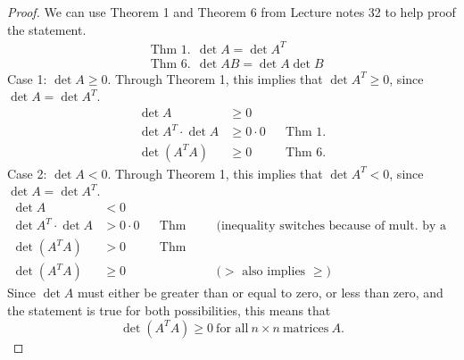\documentclass{article}
\begin{document}
\begin{proof}
  We can use Theorem 1 and Theorem 6 from Lecture notes 32 to help proof the statement.
  \begin{align*}
     & \text{Thm 1.}~~ \det A = \det A^T       \\
     & \text{Thm 6.}~~ \det AB = \det A \det B
  \end{align*}
  Case 1: $\det A \geq 0$. Through Theorem 1, this implies that $\det A^T \geq 0$, since $\det A = \det A^T$.
  \begin{align*}
    \det A                & \geq 0                            \\
    \det A^T \cdot \det A & \geq 0 \cdot 0 &  & \text{Thm 1.} \\
    \det (A^TA)           & \geq 0         &  & \text{Thm 6.}
  \end{align*}
  Case 2: $\det A < 0$. Through Theorem 1, this implies that $\det A^T < 0$, since $\det A = \det A^T$.
  \begin{align*}
    \det A                & < 0                                                                                             \\
    \det A^T \cdot \det A & > 0 \cdot 0 &  & \text{Thm 1.} &  & \text{(inequality switches because of mult. by a negative)} \\
    \det (A^TA)           & > 0         &  & \text{Thm 6.}                                                                  \\
    \det (A^TA)           & \geq 0      &  &               &  & \text{($>$ also implies $\geq$)}
  \end{align*}
  Since $\det A$ must either be greater than or equal to zero, or less than zero, and the statement is true for both possibilities, this means that
  \[
    \det(A^TA) \geq 0~\text{for all}~n \times n~\text{matrices}~A.
  \]
\end{proof}
\qdash
\end{document}
